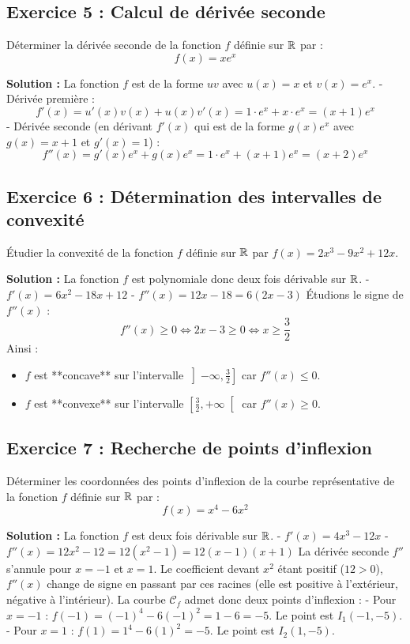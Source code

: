 \subsection*{Exercice 5 : Calcul de dérivée seconde}
Déterminer la dérivée seconde de la fonction $f$ définie sur $\mathbb{R}$ par :
\[
f(x) = x e^x
\]

\textbf{Solution :}
La fonction $f$ est de la forme $uv$ avec $u(x) = x$ et $v(x) = e^x$.
- Dérivée première :
  \[
  f'(x) = u'(x)v(x) + u(x)v'(x) = 1 \cdot e^x + x \cdot e^x = (x+1)e^x
  \]
- Dérivée seconde (en dérivant $f'(x)$ qui est de la forme $g(x)e^x$ avec $g(x) = x+1$ et $g'(x) = 1$) :
  \[
  f''(x) = g'(x)e^x + g(x)e^x = 1 \cdot e^x + (x+1)e^x = (x+2)e^x
  \]

\subsection*{Exercice 6 : Détermination des intervalles de convexité}
Étudier la convexité de la fonction $f$ définie sur $\mathbb{R}$ par $f(x) = 2x^3 - 9x^2 + 12x$.

\textbf{Solution :}
La fonction $f$ est polynomiale donc deux fois dérivable sur $\mathbb{R}$.
- $f'(x) = 6x^2 - 18x + 12$
- $f''(x) = 12x - 18 = 6(2x - 3)$
Étudions le signe de $f''(x)$ :
\[
f''(x) \ge 0 \iff 2x - 3 \ge 0 \iff x \ge \frac{3}{2}
\]
Ainsi :
\begin{itemize}
    \item $f$ est **concave** sur l'intervalle $\left]-\infty, \frac{3}{2}\right]$ car $f''(x) \le 0$.
    \item $f$ est **convexe** sur l'intervalle $\left[\frac{3}{2}, +\infty\right[$ car $f''(x) \ge 0$.
\end{itemize}

\subsection*{Exercice 7 : Recherche de points d'inflexion}
Déterminer les coordonnées des points d'inflexion de la courbe représentative de la fonction $f$ définie sur $\mathbb{R}$ par :
\[
f(x) = x^4 - 6x^2
\]

\textbf{Solution :}
La fonction $f$ est deux fois dérivable sur $\mathbb{R}$.
- $f'(x) = 4x^3 - 12x$
- $f''(x) = 12x^2 - 12 = 12(x^2 - 1) = 12(x-1)(x+1)$
La dérivée seconde $f''$ s'annule pour $x = -1$ et $x = 1$. Le coefficient devant $x^2$ étant positif ($12>0$), $f''(x)$ change de signe en passant par ces racines (elle est positive à l'extérieur, négative à l'intérieur).
La courbe $\mathcal{C}_f$ admet donc deux points d'inflexion :
- Pour $x = -1$ : $f(-1) = (-1)^4 - 6(-1)^2 = 1 - 6 = -5$. Le point est $I_1(-1, -5)$.
- Pour $x = 1$ : $f(1) = 1^4 - 6(1)^2 = -5$. Le point est $I_2(1, -5)$.

